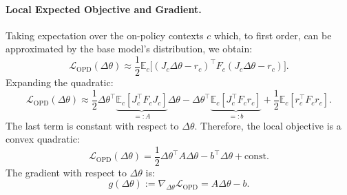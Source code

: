 \documentclass{llmxive}
\begin{document}
\paragraph{Local Expected Objective and Gradient.}
Taking expectation over the on-policy contexts \(c\) which, to first order, can be approximated by the base model's distribution, we obtain:
\begin{equation}
\mathcal{L}_{\mathrm{OPD}}(\Delta\theta) \approx \frac{1}{2} \mathbb{E}_{c}\big[ (J_c\Delta\theta - r_c)^{\top} F_c (J_c\Delta\theta - r_c) \big].
\end{equation}
Expanding the quadratic:
\begin{equation}
\mathcal{L}_{\mathrm{OPD}}(\Delta\theta) \approx 
\frac{1}{2} \Delta\theta^{\top} \underbrace{\mathbb{E}_c[J_c^{\top} F_c J_c]}_{=: A} \Delta\theta
- \Delta\theta^{\top} \underbrace{\mathbb{E}_c[J_c^{\top} F_c r_c]}_{=: b}
+ \frac{1}{2} \mathbb{E}_c[r_c^{\top} F_c r_c].
\end{equation}
The last term is constant with respect to \(\Delta\theta\). Therefore, the local objective is a convex quadratic:
\begin{equation}
\mathcal{L}_{\mathrm{OPD}}(\Delta\theta) = \frac{1}{2} \Delta\theta^{\top} A \Delta\theta - b^{\top} \Delta\theta + \text{const}.
\end{equation}
The gradient with respect to \(\Delta\theta\) is:
\begin{equation}
g(\Delta\theta) := \nabla_{\Delta\theta} \mathcal{L}_{\mathrm{OPD}} = A \Delta\theta - b.
\end{equation}
\end{document}
